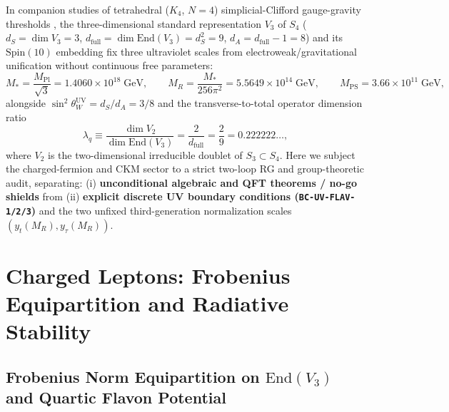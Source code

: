 \documentclass[11pt,a4paper]{article}
\begin{document}
In companion studies of tetrahedral ($K_4$, $N = 4$) simplicial-Clifford gauge-gravity thresholds \cite{Olcsak2026Zenodo,Olcsak2026Paper24}, the three-dimensional standard representation $V_3$ of $S_4$ ($d_S = \dim V_3 = 3$, $d_{\mathrm{full}} = \dim\mathrm{End}(V_3) = d_S^2 = 9$, $d_A = d_{\mathrm{full}} - 1 = 8$) and its $\mathrm{Spin}(10)$ embedding fix three ultraviolet scales from electroweak/gravitational unification without continuous free parameters:
\begin{equation}
M_* = \frac{M_{\mathrm{Pl}}}{\sqrt{3}} = 1.4060\times 10^{18}\;\mathrm{GeV}, \qquad
M_R = \frac{M_*}{256\pi^2} = 5.5649\times 10^{14}\;\mathrm{GeV}, \qquad
M_{\mathrm{PS}} = 3.66\times 10^{11}\;\mathrm{GeV},
\label{eq:frozen-scales}
\end{equation}
alongside $\sin^2\theta_W^{\mathrm{UV}} = d_S / d_A = 3/8$ and the transverse-to-total operator dimension ratio
\begin{equation}
\lambda_q \equiv \frac{\dim V_2}{\dim\mathrm{End}(V_3)} = \frac{2}{d_{\mathrm{full}}} = \frac{2}{9} = 0.222222\dots,
\label{eq:lambda-q}
\end{equation}
where $V_2$ is the two-dimensional irreducible doublet of $S_3 \subset S_4$. Here we subject the charged-fermion and CKM sector to a strict two-loop RG and group-theoretic audit, separating: (i) \textbf{unconditional algebraic and QFT theorems / no-go shields} from (ii) \textbf{explicit discrete UV boundary conditions (\texttt{BC-UV-FLAV-1/2/3})} and the two unfixed third-generation normalization scales $(y_t(M_R), y_\tau(M_R))$.

\section{Charged Leptons: Frobenius Equipartition and Radiative Stability}
\label{sec:leptons}

\subsection{Frobenius Norm Equipartition on \texorpdfstring{$\mathrm{End}(V_3)$}{End(V3)} and Quartic Flavon Potential}
\label{subsec:koide-proof}
\end{document}
